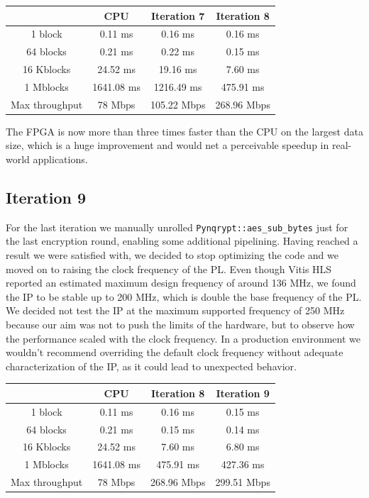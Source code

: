 \documentclass[12pt,oneside,a4paper]{article}
\begin{document}
\begin{table}[h!]
	\centering
	\begin{tabular}{cccc}
		\toprule
		 & CPU & Iteration 7 & Iteration 8 \\
		\midrule
		1 block & 0.11 ms & 0.16 ms & 0.16 ms \\
		64 blocks & 0.21 ms & 0.22 ms & 0.15 ms \\
		16 Kblocks & 24.52 ms & 19.16 ms & 7.60 ms \\
		1 Mblocks & 1641.08 ms & 1216.49 ms & 475.91 ms \\
		Max throughput & 78 Mbps & 105.22 Mbps & 268.96 Mbps \\
		\bottomrule
	\end{tabular}
\end{table}

The FPGA is now more than three times faster than the CPU on the largest data size, which is a huge improvement and would net a perceivable speedup in real-world applications.

\subsection{Iteration 9} \label{subsec:iter9}
For the last iteration we manually unrolled \texttt{Pynqrypt::aes\_sub\_bytes} just for the last encryption round, enabling some additional pipelining.
Having reached a result we were satisfied with, we decided to stop optimizing the code and we moved on to raising the clock frequency of the PL.
Even though Vitis HLS reported an estimated maximum design frequency of around 136 MHz, we found the IP to be stable up to 200 MHz, which is double the base frequency of the PL.
We decided not test the IP at the maximum supported frequency of 250 MHz because our aim was not to push the limits of the hardware, but to observe how the performance scaled with the clock frequency.
In a production environment we wouldn't recommend overriding the default clock frequency without adequate characterization of the IP, as it could lead to unexpected behavior.

\begin{table}[h!]
	\centering
	\begin{tabular}{cccc}
		\toprule
		 & CPU & Iteration 8 & Iteration 9 \\
		\midrule
		1 block & 0.11 ms & 0.16 ms & 0.15 ms \\
		64 blocks & 0.21 ms & 0.15 ms & 0.14 ms \\
		16 Kblocks & 24.52 ms & 7.60 ms & 6.80 ms \\
		1 Mblocks & 1641.08 ms & 475.91 ms & 427.36 ms \\
		Max throughput & 78 Mbps & 268.96 Mbps & 299.51 Mbps \\
		\bottomrule
	\end{tabular}
\end{table}
\end{document}
